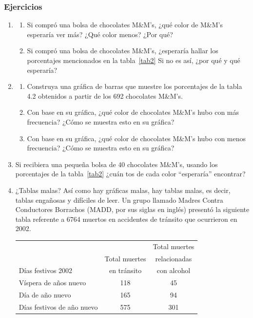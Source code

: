 \documentclass[letterpaper,10pt,twoside]{article}
\begin{document}
\subsubsection*{Ejercicios}
\begin{enumerate}
\item 
\begin{enumerate}
\item Si compró una bolsa de chocolates M\&M’s, ¿qué color de M\&M’s esperaría ver más? ¿Qué color menos? ¿Por qué? 
\item Si compró una bolsa de chocolates M\&M’s, ¿esperaría hallar los porcentajes mencionados en la tabla~\ref{tab2} Si no es así, ¿por qué y qué esperaría? 
\end{enumerate}
\item
\begin{enumerate}
\item Construya una gráfica de barras que muestre los porcentajes de la tabla 4.2 obtenidos a
partir de los 692 chocolates M\&M’s.
\item Con base en su gráfica, ¿qué color de chocolates M\&M’s hubo con más frecuencia?
¿Cómo se muestra esto en su gráfica?
\item Con base en su gráfica, ¿qué color de chocolates M\&M’s hubo con menos frecuencia?
¿Cómo se muestra esto en su gráfica?
\end{enumerate}
\item Si recibiera una pequeña bolsa de 40 chocolates M\&M’s, usando los porcentajes de la tabla~\ref{tab2} ¿cuán   tos de cada color “esperaría” encontrar?
\item ¿Tablas malas? Así como hay gráficas malas, hay tablas malas, es decir, tablas engañosas y difíciles de leer. Un grupo llamado  Madres Contra Conductores Borrachos (MADD, por sus siglas en inglés) presentó la siguiente tabla referente a 6764 muertos en accidentes de tránsito que ocurrieron en 2002.
\begin{center}
\begin{tabular}{lcc}
 &  & Total muertes \\ 
 & Total muertes & relacionadas \\ 
\hspace{15pt} Días festivos 2002 & en tránsito & con alcohol \\ 
\hline 
Víspera de años nuevo & 118 & 45 \\ 
Día de año nuevo & 165 & 94 \\ 
Días festivos de año nuevo & 575 & 301 \\ 

\end{tabular}
\end{center}
\end{enumerate}
\end{document}
